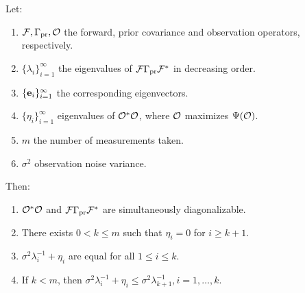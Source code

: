 \documentclass{amsart}
\numberwithin{equation}{section}
\providecommand{\DIFaddbegin}{} %
\begin{document}
\DIFaddbegin \begin{theorem}\label{thm:char}
  Let:
  \begin{enumerate}
  \item $\mathcal{F}, \Gamma_{\textup{pr}}, \mathcal{O}$ the forward, prior covariance and
    observation operators, respectively.
  \item $\{\lambda_i\}_{i=1}^\infty$ the eigenvalues of
    $\mathcal{F}\Gamma_{\textup{pr}}\mathcal{F}^*$ in decreasing order.
  \item $\{\mathbf{e}_i\}_{i=1}^\infty$ the corresponding eigenvectors.
  \item $\{\eta_i\}_{i=1}^\infty$ eigenvalues of $\mathcal{O}^*\mathcal{O}$, where
    $\mathcal{O}$ maximizes $\Psi(\mathcal{O})$.
  \item $m$ the number of measurements taken.
  \item $\sigma^2$ observation noise variance.
  \end{enumerate}
  Then:
  \begin{enumerate}
  \item $\mathcal{O}^*\mathcal{O}$ and $\mathcal{F}\Gamma_{\textup{pr}}\mathcal{F}^*$ are simultaneously diagonalizable.
  \item There exists $0 < k \leq m$ such that $\eta_i = 0$ for $i\geq k+1$.
  \item $\sigma^2\lambda_i^{-1} + \eta_i$ are equal for all $1 \leq i \leq k$.
  \item If $k < m$, then $\sigma^2\lambda_i^{-1} + \eta_i \leq
    \sigma^2\lambda_{k+1}^{-1}, i=1,\dots,k$.
  \end{enumerate}
\end{theorem}


\optimalvsnot
\end{document}
